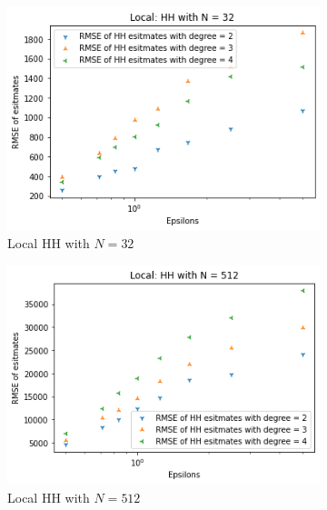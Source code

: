 \documentclass[11pt]{article}
\theoremstyle{definition}
\begin{document}
\begin{figure}[H]
     \centering
     \begin{subfigure}[b]{0.3\textwidth}
         \centering
         \includegraphics[width=\textwidth]{figures/hh_loc_epsi/hh_lin_N=32.png}
         \caption{Local HH with $N=32$}
         \label{fig:d2}
     \end{subfigure}
     \hfill
     \begin{subfigure}[b]{0.3\textwidth}
         \centering
         \includegraphics[width=\textwidth]{figures/hh_loc_epsi/hh_lin_N=512.png}
         \caption{Local HH with $N=512$}
         \label{fig:e2}
     \end{subfigure}
     \hfill
     \begin{subfigure}[b]{0.3\textwidth}
         \centering

\end{subfigure}
\end{figure}
\end{document}

